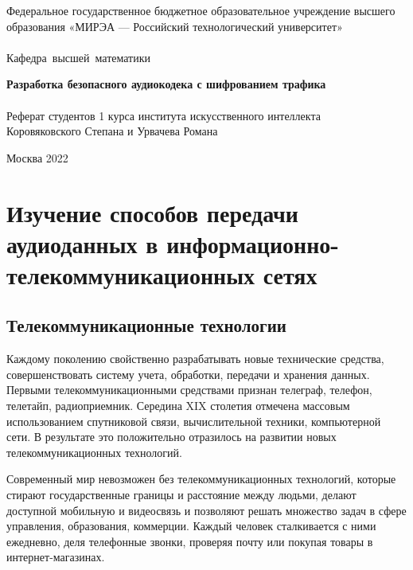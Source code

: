 \documentclass[a4paper]{report}
\begin{document}
\begin{titlepage}
\newpage



\begin{center}
\vfill

Федеральное государственное бюджетное образовательное учреждение высшего образования «МИРЭА — Российский технологический университет»\\
\ \\

\hfill\vbox
{
\hbox{Кафедра высшей математики}
}

\vfill

{\large\bf Разработка безопасного аудиокодека с шифрованием трафика\\}
\ \\
Реферат студентов 1 курса института искусственного интеллекта\\
Коровяковского Степана и Урвачева Романа

\vfill


\vfill

Москва 2022
\end{center}

\end{titlepage}
\tableofcontents
\newpage

\chapter{Изучение способов передачи аудиоданных в информационно-телекоммуникационных сетях}
\section{Телекоммуникационные технологии}
Каждому поколению свойственно разрабатывать новые технические средства, совершенствовать систему учета, обработки, передачи и хранения данных. Первыми телекоммуникационными средствами признан телеграф, телефон, телетайп, радиоприемник. Середина XIX столетия отмечена массовым использованием спутниковой связи, вычислительной техники, компьютерной сети. В результате это положительно отразилось на развитии новых телекоммуникационных технологий.
\par Современный мир невозможен без телекоммуникационных технологий, которые стирают государственные границы и расстояние между людьми, делают доступной мобильную и видеосвязь и позволяют решать множество задач в сфере управления, образования, коммерции. Каждый человек сталкивается с ними ежедневно, деля телефонные звонки, проверяя почту или покупая товары в интернет-магазинах.
\end{document}
